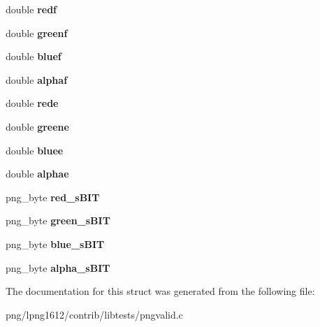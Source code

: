 \begin{DoxyCompactItemize}
\item 
\hypertarget{structimage__pixel_acc00f59c27738fb37911955722e58bfe}{double {\bfseries redf}}\label{structimage__pixel_acc00f59c27738fb37911955722e58bfe}

\item 
\hypertarget{structimage__pixel_ab07decf8add5ac7aad6fda3a65ba290e}{double {\bfseries greenf}}\label{structimage__pixel_ab07decf8add5ac7aad6fda3a65ba290e}

\item 
\hypertarget{structimage__pixel_adb417fef4da0946f0de8e3130ca5a95b}{double {\bfseries bluef}}\label{structimage__pixel_adb417fef4da0946f0de8e3130ca5a95b}

\item 
\hypertarget{structimage__pixel_a8c1ab3e35868dc69fb084d61f89b31e9}{double {\bfseries alphaf}}\label{structimage__pixel_a8c1ab3e35868dc69fb084d61f89b31e9}

\item 
\hypertarget{structimage__pixel_a6839e0eaea0108bcee199fc4b3a71c61}{double {\bfseries rede}}\label{structimage__pixel_a6839e0eaea0108bcee199fc4b3a71c61}

\item 
\hypertarget{structimage__pixel_af98570568f57548080dce94a32d4db17}{double {\bfseries greene}}\label{structimage__pixel_af98570568f57548080dce94a32d4db17}

\item 
\hypertarget{structimage__pixel_a7325f5ac240aabf697f164bc899d174a}{double {\bfseries bluee}}\label{structimage__pixel_a7325f5ac240aabf697f164bc899d174a}

\item 
\hypertarget{structimage__pixel_a16009b8b40dde991592c2f279c1c0a1d}{double {\bfseries alphae}}\label{structimage__pixel_a16009b8b40dde991592c2f279c1c0a1d}

\item 
\hypertarget{structimage__pixel_ae8c164de2202410086e6d559a7272d63}{png\+\_\+byte {\bfseries red\+\_\+s\+B\+I\+T}}\label{structimage__pixel_ae8c164de2202410086e6d559a7272d63}

\item 
\hypertarget{structimage__pixel_a7b201c414acbf3800d399b30ac57e4f8}{png\+\_\+byte {\bfseries green\+\_\+s\+B\+I\+T}}\label{structimage__pixel_a7b201c414acbf3800d399b30ac57e4f8}

\item 
\hypertarget{structimage__pixel_a7708c09699d397bcd6b4fdaee15a338e}{png\+\_\+byte {\bfseries blue\+\_\+s\+B\+I\+T}}\label{structimage__pixel_a7708c09699d397bcd6b4fdaee15a338e}

\item 
\hypertarget{structimage__pixel_aefe4119fd96e5b3ac9e70c54af0bd9b7}{png\+\_\+byte {\bfseries alpha\+\_\+s\+B\+I\+T}}\label{structimage__pixel_aefe4119fd96e5b3ac9e70c54af0bd9b7}

\end{DoxyCompactItemize}


The documentation for this struct was generated from the following file\+:\begin{DoxyCompactItemize}
\item 
png/lpng1612/contrib/libtests/pngvalid.\+c\end{DoxyCompactItemize}
